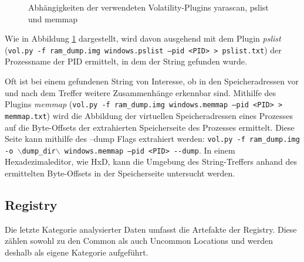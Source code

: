\begin{figure}[h!]
	\centering
	\small
	\centerline{\resizebox{\linewidth}{!}{}}
	\caption{Abhängigkeiten der verwendeten Volatility-Plugins yarascan, pslist und memmap}
	\label{img:volatility-plugins}
\end{figure}

Wie in Abbildung \ref{img:volatility-plugins} dargestellt, wird davon ausgehend mit dem Plugin \textit{pslist} (\texttt{vol.py -f ram\_dump.img windows.pslist --pid <PID> > pslist.txt}) der Prozessname der PID ermittelt, in dem der String gefunden wurde.

Oft ist bei einem gefundenen String von Interesse, ob in den Speicheradressen vor und nach dem Treffer weitere Zusammenhänge erkennbar sind.
Mithilfe des Plugins \textit{memmap} (\texttt{vol.py -f ram\_dump.img windows.memmap --pid <PID> > memmap.txt}) wird die Abbildung der virtuellen Speicheradressen eines Prozesses auf die Byte-Offsets der extrahierten Speicherseite des Prozesses ermittelt.
Diese Seite kann mithilfe des \glqq{}--dump\grqq{} Flags extrahiert werden: \texttt{vol.py -f ram\_dump.img -o $\backslash$dump\_dir$\backslash$ windows.memmap --pid <PID> -{}-dump}.
In einem Hexadezimaleditor, wie HxD, kann die Umgebung des String-Treffers anhand des ermittelten Byte-Offsets in der Speicherseite untersucht werden.

\subsection{Registry}
\label{subsection:methodik-datenanalyse-registry}
Die letzte Kategorie analysierter Daten umfasst die Artefakte der Registry.
Diese zählen sowohl zu den Common als auch Uncommon Locations und werden deshalb als eigene Kategorie aufgeführt.

